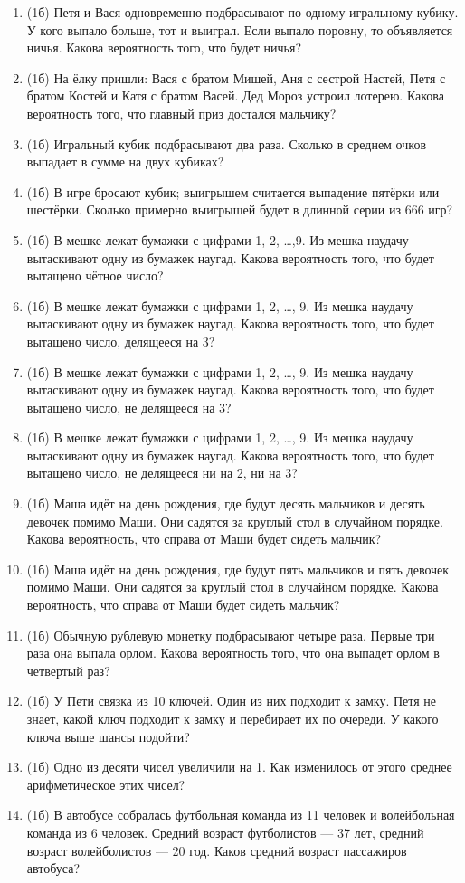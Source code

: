 \documentclass[a4paper, 12pt]{article}
\begin{document}

\begin{enumerate}
\item (1б) Петя и Вася одновременно подбрасывают по одному игральному кубику. У кого выпало больше, тот и выиграл. Если выпало поровну, то объявляется ничья. Какова вероятность того, что будет ничья?
\item (1б) На ёлку пришли: Вася с братом Мишей, Аня с сестрой Настей, Петя с братом Костей и Катя с братом Васей. Дед Мороз устроил лотерею. Какова вероятность того, что главный приз достался мальчику?
\item (1б) Игральный кубик подбрасывают два раза. Сколько в среднем очков выпадает в сумме на двух кубиках?
\item (1б) В игре бросают кубик; выигрышем считается выпадение пятёрки или шестёрки. Сколько примерно выигрышей будет в длинной серии из 666 игр?
\item (1б) В мешке лежат бумажки с цифрами 1, 2, \ldots ,9. Из мешка наудачу вытаскивают одну из бумажек наугад. Какова вероятность того, что будет вытащено чётное число?
\item (1б) В мешке лежат бумажки с цифрами 1, 2, \ldots, 9. Из мешка наудачу вытаскивают одну из бумажек наугад. Какова вероятность того, что будет вытащено число, делящееся на 3?
\item (1б) В мешке лежат бумажки с цифрами 1, 2, \ldots, 9. Из мешка наудачу вытаскивают одну из бумажек наугад. Какова вероятность того, что будет вытащено число, не делящееся на 3?
\item (1б) В мешке лежат бумажки с цифрами 1, 2, \ldots, 9. Из мешка наудачу вытаскивают одну из бумажек наугад. Какова вероятность того, что будет вытащено число, не делящееся ни на 2, ни на 3?
\item (1б) Маша идёт на день рождения, где будут десять мальчиков и десять девочек помимо Маши. Они садятся за круглый стол в случайном порядке. Какова вероятность, что справа от Маши будет сидеть мальчик?
\item (1б) Маша идёт на день рождения, где будут пять мальчиков и пять девочек помимо Маши. Они садятся за круглый стол в случайном порядке. Какова вероятность, что справа от Маши будет сидеть мальчик?
\item (1б) Обычную рублевую монетку подбрасывают четыре раза. Первые три раза она выпала орлом. Какова вероятность того, что она выпадет орлом в четвертый раз?
\item (1б) У Пети связка из 10 ключей. Один из них подходит к замку. Петя не знает, какой ключ подходит к замку и перебирает их по очереди. У какого ключа выше шансы подойти?
\item (1б) Одно из десяти чисел увеличили на 1. Как изменилось от этого среднее арифметическое этих чисел?
\item (1б) В автобусе собралась футбольная команда из 11 человек и волейбольная команда из 6 человек. Средний возраст футболистов — 37 лет, средний возраст волейболистов — 20 год. Каков средний возраст пассажиров автобуса?
\end{enumerate}
\end{document}
